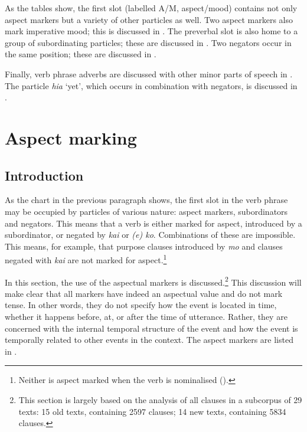 As the tables show, the first slot (labelled A/M, aspect/mood) contains not only aspect markers but a variety of other particles as well. Two aspect markers also mark imperative mood; this is discussed in . The preverbal slot is also home to a group of subordinating particles; these are discussed in . Two negators occur in the same position; these are discussed in . 

Finally, verb phrase adverbs are discussed with other minor parts of speech in . The particle \textit{hia} ‘yet’, which occurs in combination with negators, is discussed in .

\section{Aspect marking}\label{sec:7.2}
\subsection{Introduction}\label{sec:7.2.1}

As the chart in the previous paragraph shows, the first slot in the verb phrase may be occupied by particles of various nature: aspect markers, subordinators and negators. This means that a verb is either marked for aspect, introduced by a subordinator, or negated by \textit{kai} or \textit{(e) ko}. Combinations of these are impossible. This means, for example, that purpose clauses introduced by \textit{mo} and clauses negated with \textit{kai} are not marked for aspect.\footnote{\label{fn:309}Neither is aspect marked when the verb is nominalised ().} 

In this section, the use of the aspectual markers is discussed.\footnote{\label{fn:310}This section is largely based on the analysis of all clauses in a subcorpus of 29 texts: 15 old texts, containing 2597 clauses; 14 new texts, containing 5834 clauses.}  This discussion will make clear that all markers have indeed an aspectual value and do not mark tense. In other words, they do not specify how the event is located in time, whether it happens before, at, or after the time of utterance. Rather, they are concerned with the internal temporal structure of the event and how the event is temporally related to other events in the context. The aspect markers are listed in .

